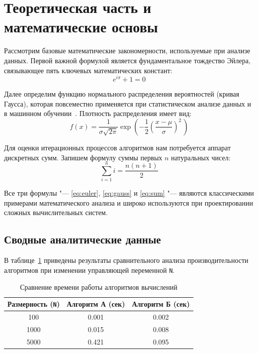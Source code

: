 \section{Теоретическая часть и математические основы}

Рассмотрим базовые математические закономерности, используемые при анализе данных. Первой важной формулой является фундаментальное тождество Эйлера, связывающее пять ключевых математических констант:
\begin{equation}
\label{eq:euler}
e^{i\pi} + 1 = 0
\end{equation}

Далее определим функцию нормального распределения вероятностей (кривая Гаусса), которая повсеместно применяется при статистическом анализе данных и в машинном обучении~\cite{henrick2017ml}. Плотность распределения имеет вид:
\begin{equation}
\label{eq:gauss}
f(x) = \frac{1}{\sigma \sqrt{2\pi}} \exp\left( -\frac{1}{2}\left(\frac{x-\mu}{\sigma}\right)^{\!2} \, \right)
\end{equation}

Для оценки итерационных процессов алгоритмов нам потребуется аппарат дискретных сумм. Запишем формулу суммы первых $n$ натуральных чисел:
\begin{equation}
\label{eq:sum}
\sum_{i=1}^{n} i = \frac{n(n+1)}{2}
\end{equation}

Все три формулы "--- \eqref{eq:euler}, \eqref{eq:gauss} и \eqref{eq:sum} "--- являются классическими примерами математического анализа и широко используются при проектировании сложных вычислительных систем.

\subsection{Сводные аналитические данные}

В таблице~\ref{tab:metrics} приведены результаты сравнительного анализа производительности алгоритмов при изменении управляющей переменной \texttt{N}.

\begin{table}[htbp]
    \centering
    \caption{Сравнение времени работы алгоритмов вычислений}
    \label{tab:metrics}
    \begin{tabular}{ccc}
        \hline
        Размерность (\texttt{N}) & Алгоритм А (сек) & Алгоритм Б (сек) \\
        \hline
        100  & 0.001 & 0.002 \\
        1000 & 0.015 & 0.008 \\
        5000 & 0.421 & 0.095 \\
        \hline
    \end{tabular}
\end{table}